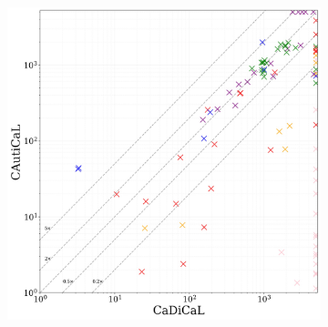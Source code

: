 \begin{figure}[!h]
    \centering
    \begin{subfigure}[t]{0.45\textwidth}
            \centering
            \includegraphics[width=\textwidth]{figs/cadical_vs_cautical_interesting.jpg}
            \label{fig:cautical-vs-cadical}
    \end{subfigure}
    \begin{subfigure}[t]{0.45\textwidth}
        \centering

\end{subfigure}
\end{figure}
